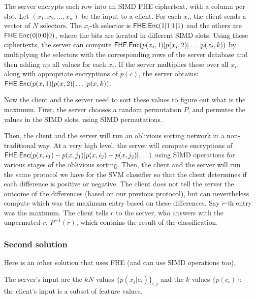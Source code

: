 \documentclass[11pt]{article}
\begin{document}
The server encrypts each row into an SIMD FHE ciphertext, with a column per slot. 
Let $(x_1, x_2, \dots, x_n)$ be the input to a client.
For each $x_i$, the client sends a vector of $N$ selectors. The $x_i$-th selector is $\mathsf{FHE.Enc}(1|1|1|1)$ and the others are $\mathsf{FHE.Enc}(0|0|0|0)$, where the bits are located in different SIMD slots. Using these ciphertexts, the server can compute $\mathsf{FHE.Enc}(p(x_i, 1)|p(x_i, 2)| \dots | p(x_i, k))$ by multiplying the selectors with the corresponding rows of the server database and then adding up all values for each $x_i$.  If the server multiplies these over all $x_i$, along with appropriate encryptions of $p(c)$, the server obtains:
 $\mathsf{FHE.Enc}(p(x,1)|p(x, 2)| \dots | p(x, k))$.
 
 Now the client and the server need to sort these values to figure out what is the maximum.
 First, the server chooses a random permutation $P$, and permutes the values in the SIMD slots, using SIMD permutations.
 
 Then, the client and the server will run an oblivious sorting network in a non-traditional way. At a very high level, the server will compute encryptions of $\mathsf{FHE.Enc}(p(x, i_1) - p(x, j_1) | p(x, i_2) - p(x, j_2) | \dots )$ using SIMD operations for various stages of the oblivious sorting. Then, the client and the server will run the same protocol we have for the SVM classifier so that the client determines if each difference is positive or negative.  The client does not tell the server the outcome of the differences (based on our previous protocol), but can nevertheless compute which was the maximum entry based on these differences. Say $r$-th entry was the maximum. The client tells $r$ to the server, who answers with the unpermuted $r$, $P^{-1}(r)$, which contains the result of the classification.
   

\subsubsection{Second solution} %
\label{ssub:bayes_solution_2}
	Here is an other solution that uses FHE (and can use SIMD operations too).
	
	The server's input are the $kN$ values $\{p(x_j|c_i)\}_{i,j}$ and the $k$ values $\{p(c_i)\}$; the client's input is a subset of feature values.
	
\end{document}
